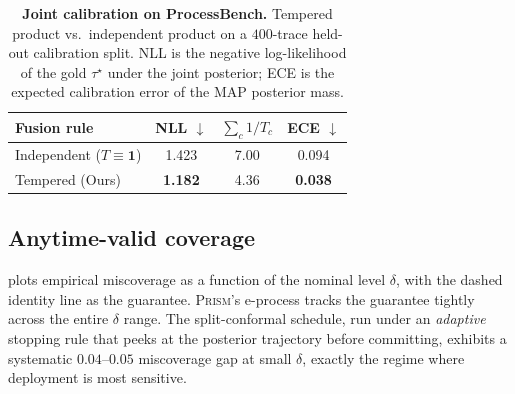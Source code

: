 \documentclass[11pt,a4paper]{article}
\theoremstyle{plain}
\theoremstyle{definition}
\theoremstyle{remark}
\begin{document}
\begin{table}[t]
\centering
\caption{\textbf{Joint calibration on ProcessBench.}
Tempered product vs.\ independent product on a $400$-trace held-out
calibration split. \textsc{NLL} is the negative log-likelihood of
the gold $\tau^\star$ under the joint posterior; \textsc{ECE} is the
expected calibration error of the MAP posterior mass.}
\label{tab:calibration}
\small
\begin{tabular}{lccc}
\toprule
Fusion rule & \textsc{NLL} $\downarrow$ &
  $\sum_c 1/T_c$ & \textsc{ECE} $\downarrow$ \\
\midrule
Independent ($T \equiv \mathbf{1}$) & 1.423 & 7.00 & 0.094 \\
Tempered (Ours) & \textbf{1.182} & 4.36 & \textbf{0.038} \\
\bottomrule
\end{tabular}
\end{table}

\subsection{Anytime-valid coverage}

 plots empirical miscoverage as a function of the
nominal level $\delta$, with the dashed identity line as the
guarantee.  \textsc{Prism}'s e-process tracks the guarantee tightly
across the entire $\delta$ range. The split-conformal schedule, run
under an \emph{adaptive} stopping rule that peeks at the posterior
trajectory before committing, exhibits a systematic
$0.04$--$0.05$ miscoverage gap at small $\delta$, exactly the
regime where deployment is most sensitive.
\end{document}
